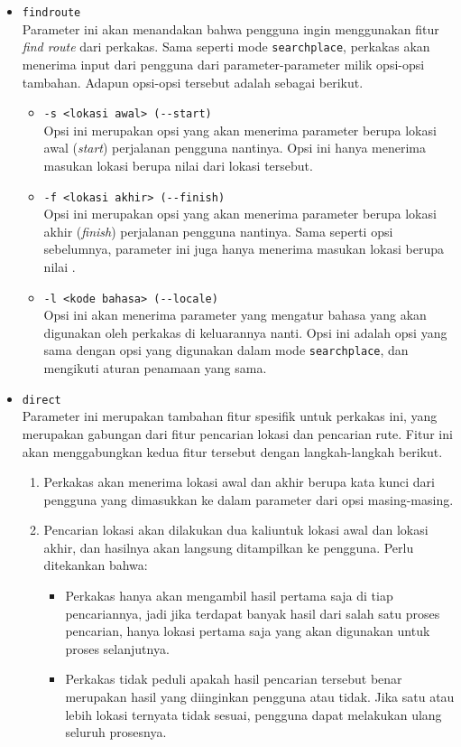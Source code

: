 \begin{itemize}
\begin{itemize}
		\item \verb|findroute|\\
		Parameter ini akan menandakan bahwa pengguna ingin menggunakan fitur \textit{find route} dari perkakas. Sama seperti mode \verb|searchplace|, perkakas akan menerima input dari pengguna dari parameter-parameter milik opsi-opsi tambahan. Adapun opsi-opsi tersebut adalah sebagai berikut.
		
		\begin{itemize}
			\item \verb|-s <lokasi awal> (--start)|\\
			Opsi ini merupakan opsi yang akan menerima parameter berupa lokasi awal (\textit{start}) perjalanan pengguna nantinya. Opsi ini hanya menerima masukan lokasi berupa nilai \latlon\xspace dari lokasi tersebut.
			\item \verb|-f <lokasi akhir> (--finish)|\\
			Opsi ini merupakan opsi yang akan menerima parameter berupa lokasi akhir (\textit{finish}) perjalanan pengguna nantinya. Sama seperti opsi sebelumnya, parameter ini juga hanya menerima masukan lokasi berupa nilai \latlon.
			\item \verb|-l <kode bahasa> (--locale)|\\
			Opsi ini akan menerima parameter yang mengatur bahasa yang akan digunakan oleh perkakas di keluarannya nanti. Opsi ini adalah opsi yang sama dengan opsi yang digunakan dalam mode \verb|searchplace|, dan mengikuti aturan penamaan yang sama.
		\end{itemize}
		
		\item \verb|direct|\\
		Parameter ini merupakan tambahan fitur spesifik untuk perkakas ini, yang merupakan gabungan dari fitur pencarian lokasi dan pencarian rute. Fitur ini akan menggabungkan kedua fitur tersebut dengan langkah-langkah berikut.
		
		\begin{enumerate}
			\item Perkakas akan menerima lokasi awal dan akhir berupa kata kunci dari pengguna yang dimasukkan ke dalam parameter dari opsi masing-masing.
			\item Pencarian lokasi akan dilakukan dua kali\textemdash untuk lokasi awal dan lokasi akhir, dan hasilnya akan langsung ditampilkan ke pengguna. Perlu ditekankan bahwa:
			
			\begin{itemize}
				\item Perkakas hanya akan mengambil hasil pertama saja di tiap pencariannya, jadi jika terdapat banyak hasil dari salah satu proses pencarian, hanya lokasi pertama saja yang akan digunakan untuk proses selanjutnya.
				\item Perkakas tidak peduli apakah hasil pencarian tersebut benar merupakan hasil yang diinginkan pengguna atau tidak. Jika satu atau lebih lokasi ternyata tidak sesuai, pengguna dapat melakukan ulang seluruh prosesnya.
			\end{itemize}
			

\end{enumerate}
\end{itemize}
\end{itemize}
